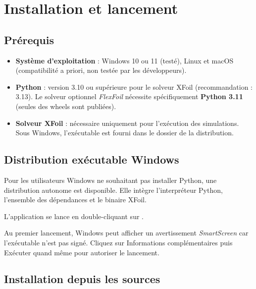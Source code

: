 \chapter{Installation et lancement}
\label{chap:installation}

\section{Prérequis}

\begin{itemize}
    \item \textbf{Système d'exploitation} : Windows 10 ou 11
        (testé), Linux et macOS (compatibilité a priori, non
        testée par les développeurs).
    \item \textbf{Python} : version 3.10 ou supérieure pour le
        solveur XFoil (recommandation : 3.13). Le solveur optionnel
        \emph{FlexFoil} nécessite spécifiquement \textbf{Python 3.11}
        (seules des wheels  sont publiées).
    \item \textbf{Solveur XFoil} : nécessaire uniquement pour
        l'exécution des simulations. Sous Windows, l'exécutable
         est fourni dans le dossier
         de la distribution.
\end{itemize}

\section{Distribution exécutable Windows}

Pour les utilisateurs Windows ne souhaitant pas installer Python,
une distribution  autonome est disponible. Elle
intègre l'interpréteur Python, l'ensemble des dépendances et le
binaire XFoil.

L'application se lance en double-cliquant sur
.

\begin{noteinfo}
Au premier lancement, Windows peut afficher un avertissement
\emph{SmartScreen} car l'exécutable n'est pas signé. Cliquez
sur \og Informations complémentaires \fg{} puis \og Exécuter
quand même \fg{} pour autoriser le lancement.
\end{noteinfo}

\section{Installation depuis les sources}

